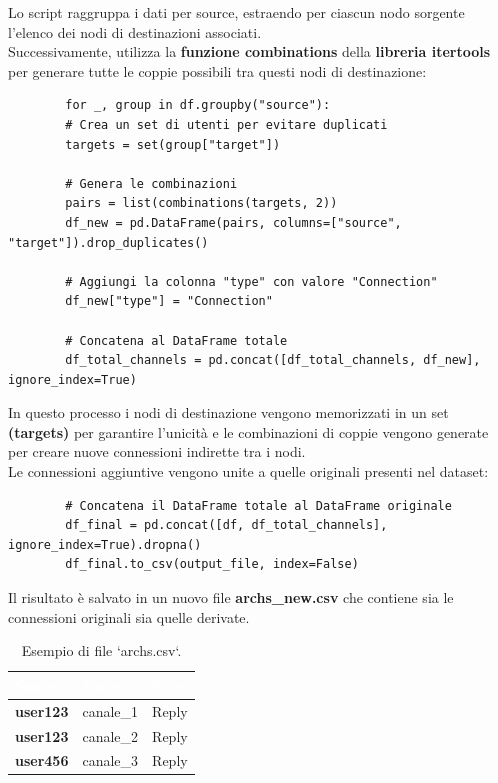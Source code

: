 \documentclass[12pt]{article}
\begin{document}
	Lo script raggruppa i dati per source, estraendo per ciascun nodo sorgente l'elenco dei nodi di destinazioni associati.\\
	Successivamente, utilizza la \textbf{funzione combinations} della \textbf{libreria itertools} per generare tutte le coppie possibili tra questi nodi di destinazione:
	\begin{lstlisting}
		for _, group in df.groupby("source"):
		# Crea un set di utenti per evitare duplicati
		targets = set(group["target"])
		
		# Genera le combinazioni
		pairs = list(combinations(targets, 2))
		df_new = pd.DataFrame(pairs, columns=["source", "target"]).drop_duplicates()
		
		# Aggiungi la colonna "type" con valore "Connection"
		df_new["type"] = "Connection"
		
		# Concatena al DataFrame totale
		df_total_channels = pd.concat([df_total_channels, df_new], ignore_index=True)
	\end{lstlisting}
	In questo processo i nodi di destinazione vengono memorizzati in un set \textbf{(targets)} per garantire l'unicità e le combinazioni di coppie vengono generate per creare nuove connessioni indirette tra i nodi.\\
	Le connessioni aggiuntive vengono unite a quelle originali presenti nel dataset:
	\begin{lstlisting}
		# Concatena il DataFrame totale al DataFrame originale
		df_final = pd.concat([df, df_total_channels], ignore_index=True).dropna()
		df_final.to_csv(output_file, index=False)
	\end{lstlisting}
	Il risultato è salvato in un nuovo file \textbf{archs\_new.csv} che contiene sia le connessioni originali sia quelle derivate.
	\begin{table}
		\begin{tabular}{|p{5cm}|p{4cm}|p{4cm}|}
			\hline
			\cellcolor{darkblue}\textcolor{white}{\textbf{Source}} & 
			\cellcolor{darkblue}\textcolor{white}{\textbf{Target}} & 
			\cellcolor{darkblue}\textcolor{white}{\textbf{Type}} \\
			\hline
			\textbf{user123} & canale\_1 & Reply \\
			\hline
			\textbf{user123} & canale\_2 & Reply\\
			\hline
			\textbf{user456} & canale\_3 & Reply\\
		\end{tabular}
		\caption{Esempio di file `archs.csv`.}
		\label{tab:archs.csv}
	\end{table}
\end{document}
